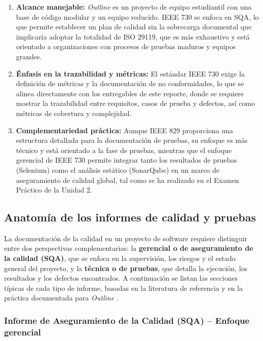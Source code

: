 \documentclass[12pt, letterpaper]{article}
\begin{document}
\begin{enumerate}
    \item \textbf{Alcance manejable:} \textit{Outline} es un proyecto de equipo estudiantil con una base de código modular y un equipo reducido. IEEE 730 se enfoca en SQA, lo que permite establecer un plan de calidad sin la sobrecarga documental que implicaría adoptar la totalidad de ISO 29119, que es más exhaustivo y está orientado a organizaciones con procesos de pruebas maduros y equipos grandes.
    \item \textbf{Énfasis en la trazabilidad y métricas:} El estándar IEEE 730 exige la definición de métricas y la documentación de no conformidades, lo que se alinea directamente con los entregables de este reporte, donde se requiere mostrar la trazabilidad entre requisitos, casos de prueba y defectos, así como métricas de cobertura y complejidad.
    \item \textbf{Complementariedad práctica:} Aunque IEEE 829 proporciona una estructura detallada para la documentación de pruebas, su enfoque es más técnico y está orientado a la fase de pruebas, mientras que el enfoque gerencial de IEEE 730 permite integrar tanto los resultados de pruebas (Selenium) como el análisis estático (SonarQube) en un marco de aseguramiento de calidad global, tal como se ha realizado en el Examen Práctico de la Unidad 2.
\end{enumerate}

\subsection{Anatomía de los informes de calidad y pruebas}

La documentación de la calidad en un proyecto de software requiere distinguir entre dos perspectivas complementarias: la \textbf{gerencial o de aseguramiento de la calidad (SQA)}, que se enfoca en la supervisión, los riesgos y el estado general del proyecto, y la \textbf{técnica o de pruebas}, que detalla la ejecución, los resultados y los defectos encontrados. A continuación se listan las secciones típicas de cada tipo de informe, basadas en la literatura de referencia y en la práctica documentada para \textit{Outline} \citep{ieee730, galin2018}.

\subsubsection*{Informe de Aseguramiento de la Calidad (SQA) – Enfoque gerencial}
\end{document}
